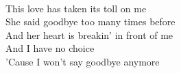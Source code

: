 \\
This love has taken its toll on me \\
She said goodbye too many times before \\
And her heart is breakin' in front of me \\
And I have no choice \\
'Cause I won't say goodbye anymore \\
